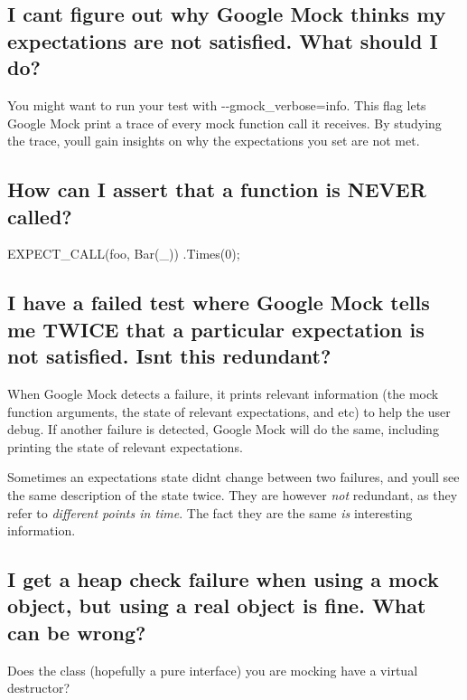 \subsection*{I can\textquotesingle{}t figure out why Google Mock thinks my expectations are not satisfied. What should I do?}

You might want to run your test with {\ttfamily -\/-\/gmock\+\_\+verbose=info}. This flag lets Google Mock print a trace of every mock function call it receives. By studying the trace, you\textquotesingle{}ll gain insights on why the expectations you set are not met.

\subsection*{How can I assert that a function is N\+E\+V\+ER called?}


\begin{DoxyCode}
EXPECT\_CALL(foo, Bar(\_))
    .Times(0);
\end{DoxyCode}


\subsection*{I have a failed test where Google Mock tells me T\+W\+I\+CE that a particular expectation is not satisfied. Isn\textquotesingle{}t this redundant?}

When Google Mock detects a failure, it prints relevant information (the mock function arguments, the state of relevant expectations, and etc) to help the user debug. If another failure is detected, Google Mock will do the same, including printing the state of relevant expectations.

Sometimes an expectation\textquotesingle{}s state didn\textquotesingle{}t change between two failures, and you\textquotesingle{}ll see the same description of the state twice. They are however {\itshape not} redundant, as they refer to {\itshape different points in time}. The fact they are the same {\itshape is} interesting information.

\subsection*{I get a heap check failure when using a mock object, but using a real object is fine. What can be wrong?}

Does the class (hopefully a pure interface) you are mocking have a virtual destructor?

